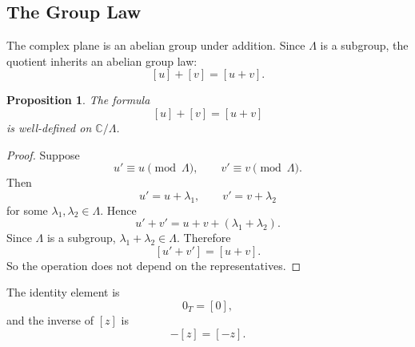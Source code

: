 \documentclass[11pt]{article}
\newcommand{\C}{\mathbb{C}}
\newtheorem*{proposition}{Proposition}
\begin{document}
\subsection{The Group Law}

The complex plane is an abelian group under addition.  Since \(\Lambda\) is a
subgroup, the quotient inherits an abelian group law:
\[
[u]+[v]=[u+v].
\]

\begin{proposition}
The formula
\[
[u]+[v]=[u+v]
\]
is well-defined on \(\C/\Lambda\).
\end{proposition}

\begin{proof}
Suppose
\[
u'\equiv u\pmod{\Lambda},
\qquad
v'\equiv v\pmod{\Lambda}.
\]
Then
\[
u'=u+\lambda_1,\qquad v'=v+\lambda_2
\]
for some \(\lambda_1,\lambda_2\in\Lambda\).  Hence
\[
u'+v'=u+v+(\lambda_1+\lambda_2).
\]
Since \(\Lambda\) is a subgroup, \(\lambda_1+\lambda_2\in\Lambda\).  Therefore
\[
[u'+v']=[u+v].
\]
So the operation does not depend on the representatives.
\end{proof}

The identity element is
\[
0_T=[0],
\]
and the inverse of \([z]\) is
\[
-[z]=[-z].
\]
\end{document}
